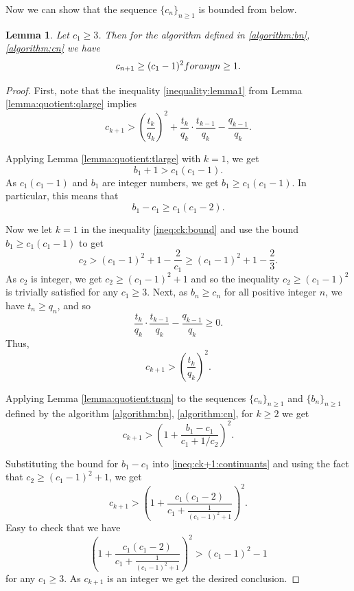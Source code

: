 \documentclass{amsart}
\newtheorem{lemma}[theorem]{Lemma}
\theoremstyle{definition}
\newcommand{\0}{\mbf 0}%
\renewcommand{\text}{\textup}
\begin{document}
Now we can show that the sequence $\{c_n\}_{n\geq1}$ is bounded from below.
\begin{lemma}\label{lemma:growth:cn}
Let $c_1\geq3$. Then for the algorithm defined in \eqref{algorithm:bn}, \eqref{algorithm:cn} we have
\begin{equation}\label{ineq:cn:growing}
    c_{n+1} \geq (c_1 -1)^2 \text{ for any } n\geq1.
\end{equation}
\end{lemma}


\begin{proof}
First, note that the inequality \eqref{inequality:lemma1} from Lemma \ref{lemma:quotient:qlarge} implies
\begin{equation}\label{ineq:ck:bound}
    c_{k+1} > \left(\frac{t_k}{q_k}\right)^2 + \frac{t_k}{q_k} \cdot \frac{t_{k-1}}{q_{k}}- \frac{q_{k-1}}{q_{k}}.
\end{equation}

Applying Lemma \ref{lemma:quotient:tlarge} with $k=1$, we get
$$
b_1 +1 >c_1 (c_1-1).
$$
As $c_1(c_1-1)$ and $b_1$ are integer numbers, we get $b_1 \geq c_1 (c_1-1). $
In particular, this means that 
\begin{equation}\label{ineq:b-c}
    b_1 -c_1 \geq c_1 (c_1-2).
\end{equation}

Now we let $k=1$ in the inequality \eqref{ineq:ck:bound} and use the bound $b_1 \geq c_1 (c_1-1) $ to get
$$
c_2 > (c_1-1)^2 +1 - \frac{2}{c_1} \geq (c_1-1)^2 +1 - \frac{2}{3}.
$$
As $c_2$ is integer, we get $c_2 \geq (c_1-1)^2 +1$ and so the inequality $c_2\geq(c_1-1)^2$ is trivially satisfied for any $c_1\geq3$. Next, as $b_n\geq c_n$ for all positive integer $n$, we have $t_n\geq q_n$, and so
$$
\frac{t_k}{q_k} \cdot \frac{t_{k-1}}{q_{k}}- \frac{q_{k-1}}{q_{k}} \geq 0.
$$
Thus,
$$
 c_{k+1} > \left(\frac{t_k}{q_k}\right)^2.
$$

Applying Lemma \ref{lemma:quotient:tnqn} to the sequences $\{c_n\}_{n\geq1}$ and $\{b_n\}_{n\geq1}$ defined by the algorithm \eqref{algorithm:bn}, \eqref{algorithm:cn}, for $k\geq2$ we get
\begin{equation}\label{ineq:ck+1:continuants}
c_{k+1} > \left(1 + \frac{b_1-c_1 }{c_1 +  1/c_2} \right)^2.
\end{equation}



Substituting the bound for $b_1-c_1$ into \eqref{ineq:ck+1:continuants} and using the fact that $c_2\geq (c_1-1)^2 +1$, we get
$$
c_{k+1} >  \left(1 + \frac{c_1 (c_1-2)}{c_1 +  \frac{1}{(c_1-1)^2 +1}} \right)^2.
$$
Easy to check that we have
$$
\left(1 + \frac{c_1 (c_1-2)}{c_1 +  \frac{1}{(c_1-1)^2 +1}} \right)^2 > (c_1-1)^2-1
$$
for any $c_1\geq3$. As $c_{k+1}$ is an integer we get the desired conclusion.
\end{proof}
\end{document}
